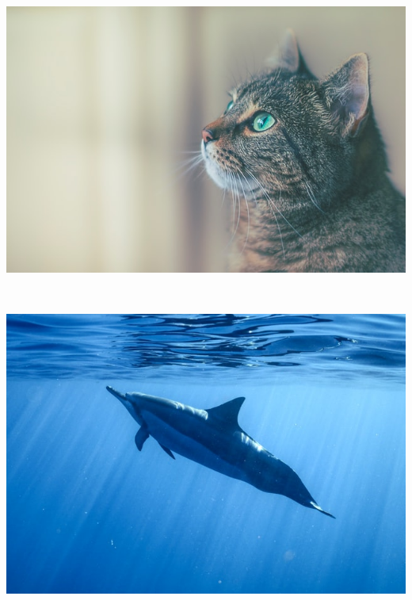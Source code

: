 \begin{example}
{\begin{gridlayout}{\textwidth}{11cm}
\begin{row}{0.3}
\begin{cell}{0.3}
                \includegraphics[width=\cellwidth, height=\rowheight, keepaspectratio]{img/cat.jpg}
            \end{cell}
            \begin{cell}{0.05}
                ~
            \end{cell}
            \begin{cell}{0.3}
                \includegraphics[width=\cellwidth, height=\rowheight, keepaspectratio]{img/dolphin.jpg}
            \end{cell}
            \begin{cell}{0.05}
                ~
            \end{cell}
            \begin{cell}{0.3}
                \centering
                \vspace{1em}
                \begin{tabular}{lr}

\end{tabular}
\end{cell}
\end{row}
\end{gridlayout}}
\end{example}
